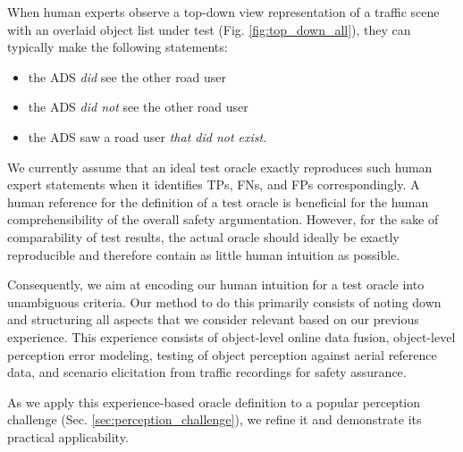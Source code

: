 \documentclass[conference]{IEEEtran}
\begin{document}

When human experts observe a top-down view representation of a traffic scene with an overlaid object list under test (Fig. \ref{fig:top_down_all}), they can typically make the following statements:
\begin{itemize}
	\item the ADS \textit{did} see the other road user
	\item the ADS \textit{did not} see the other road user 
	\item the ADS saw a road user \textit{that did not exist}.
\end{itemize}

We currently assume that an ideal test oracle exactly reproduces such human expert statements when it identifies TPs, FNs, and FPs correspondingly.
A human reference for the definition of a test oracle is beneficial for the human comprehensibility of the overall safety argumentation. 
However, for the sake of comparability of test results, the actual oracle should ideally be exactly reproducible and therefore contain as little human intuition as possible. 

Consequently, we aim at encoding our human intuition for a test oracle into unambiguous criteria. 
Our method to do this primarily consists of noting down and structuring all aspects that we consider relevant based on our previous experience. 
This experience consists of object-level online data fusion, object-level perception error modeling, testing of object perception against aerial reference data, and scenario elicitation from traffic recordings for safety assurance. 


As we apply this experience-based oracle definition to a popular perception challenge (Sec. \ref{sec:perception_challenge}), we refine it and demonstrate its practical applicability. 




\end{document}
